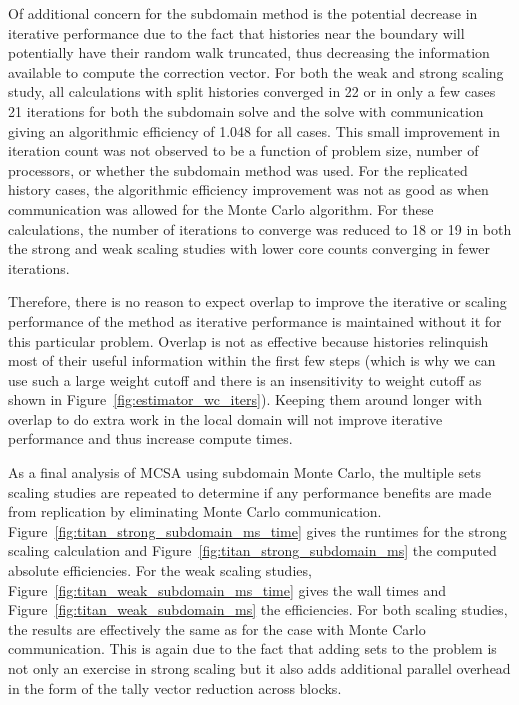 Of additional concern for the subdomain method is the potential
decrease in iterative performance due to the fact that histories near
the boundary will potentially have their random walk truncated, thus
decreasing the information available to compute the correction
vector. For both the weak and strong scaling study, all calculations
with split histories converged in 22 or in only a few cases 21
iterations for both the subdomain solve and the solve with
communication giving an algorithmic efficiency of 1.048 for all
cases. This small improvement in iteration count was not observed to
be a function of problem size, number of processors, or whether the
subdomain method was used. For the replicated history cases, the
algorithmic efficiency improvement was not as good as when
communication was allowed for the Monte Carlo algorithm. For these
calculations, the number of iterations to converge was reduced to 18
or 19 in both the strong and weak scaling studies with lower core
counts converging in fewer iterations.

Therefore, there is no reason to expect overlap to improve the
iterative or scaling performance of the method as iterative
performance is maintained without it for this particular
problem. Overlap is not as effective because histories relinquish most
of their useful information within the first few steps (which is why
we can use such a large weight cutoff and there is an insensitivity to
weight cutoff as shown in
Figure~\ref{fig:estimator_wc_iters}). Keeping them around longer with
overlap to do extra work in the local domain will not improve
iterative performance and thus increase compute times.

As a final analysis of MCSA using subdomain Monte Carlo, the multiple
sets scaling studies are repeated to determine if any performance
benefits are made from replication by eliminating Monte Carlo
communication. Figure~\ref{fig:titan_strong_subdomain_ms_time} gives
the runtimes for the strong scaling calculation and
Figure~\ref{fig:titan_strong_subdomain_ms} the computed absolute
efficiencies. For the weak scaling studies,
Figure~\ref{fig:titan_weak_subdomain_ms_time} gives the wall times and
Figure~\ref{fig:titan_weak_subdomain_ms} the efficiencies. For both
scaling studies, the results are effectively the same as for the case
with Monte Carlo communication. This is again due to the fact that
adding sets to the problem is not only an exercise in strong scaling
but it also adds additional parallel overhead in the form of the tally
vector reduction across blocks.

